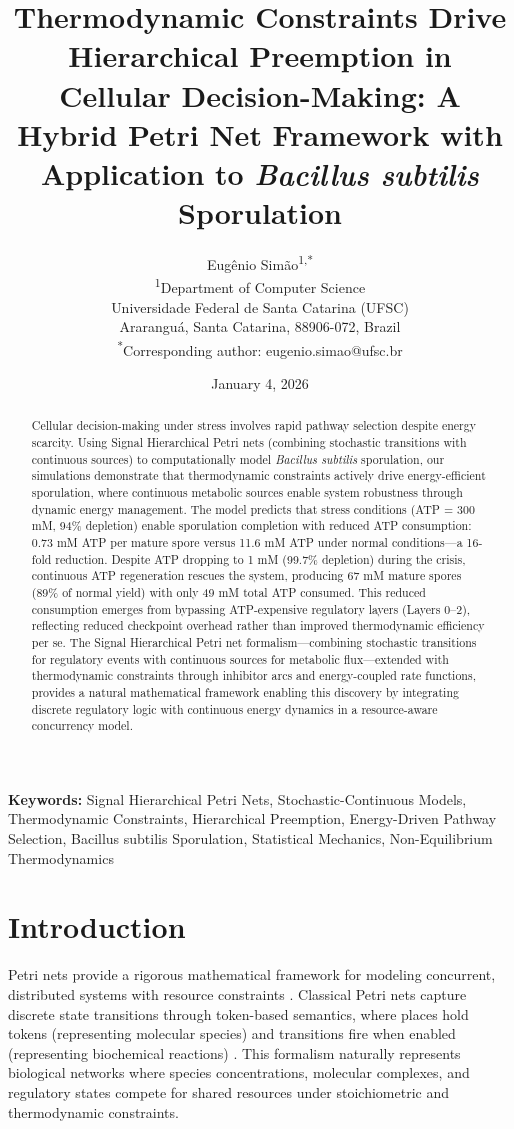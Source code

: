 \documentclass[twocolumn,11pt]{article}
\title{\textbf{Thermodynamic Constraints Drive Hierarchical Preemption in Cellular Decision-Making: A Hybrid Petri Net Framework with Application to \textit{Bacillus subtilis} Sporulation}}
\author{
Eugênio Simão\textsuperscript{1,*}\\
\textsuperscript{1}Department of Computer Science\\
Universidade Federal de Santa Catarina (UFSC)\\
Araranguá, Santa Catarina, 88906-072, Brazil\\
\textsuperscript{*}Corresponding author: eugenio.simao@ufsc.br
}
\date{January 4, 2026}
\begin{document}
\maketitle

\begin{abstract}
Cellular decision-making under stress involves rapid pathway selection despite energy scarcity. Using Signal Hierarchical Petri nets (combining stochastic transitions with continuous sources) to computationally model \textit{Bacillus subtilis} sporulation, our simulations demonstrate that thermodynamic constraints actively drive energy-efficient sporulation, where continuous metabolic sources enable system robustness through dynamic energy management. The model predicts that stress conditions (ATP = 300 mM, 94\% depletion) enable sporulation completion with reduced ATP consumption: 0.73 mM ATP per mature spore versus 11.6 mM ATP under normal conditions—a 16-fold reduction. Despite ATP dropping to 1 mM (99.7\% depletion) during the crisis, continuous ATP regeneration rescues the system, producing 67 mM mature spores (89\% of normal yield) with only 49 mM total ATP consumed. This reduced consumption emerges from bypassing ATP-expensive regulatory layers (Layers 0--2), reflecting reduced checkpoint overhead rather than improved thermodynamic efficiency per se. The Signal Hierarchical Petri net formalism—combining stochastic transitions for regulatory events with continuous sources for metabolic flux—extended with thermodynamic constraints through inhibitor arcs and energy-coupled rate functions, provides a natural mathematical framework enabling this discovery by integrating discrete regulatory logic with continuous energy dynamics in a resource-aware concurrency model.
\end{abstract}

\textbf{Keywords:} Signal Hierarchical Petri Nets, Stochastic-Continuous Models, Thermodynamic Constraints, Hierarchical Preemption, Energy-Driven Pathway Selection, Bacillus subtilis Sporulation, Statistical Mechanics, Non-Equilibrium Thermodynamics

\section{Introduction}

Petri nets provide a rigorous mathematical framework for modeling concurrent, distributed systems with resource constraints \citep{petri1962}. Classical Petri nets capture discrete state transitions through token-based semantics, where places hold tokens (representing molecular species) and transitions fire when enabled (representing biochemical reactions) \citep{chaouiya2007, heiner2008}. This formalism naturally represents biological networks where species concentrations, molecular complexes, and regulatory states compete for shared resources under stoichiometric and thermodynamic constraints.
\end{document}
